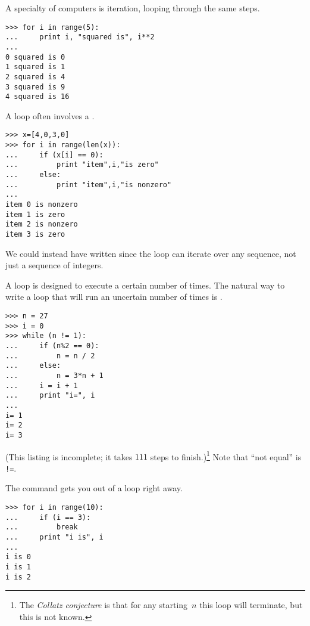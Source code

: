 A specialty of computers is iteration, looping through the same steps.
\begin{lstlisting}[style=python]
>>> for i in range(5):
...     print i, "squared is", i**2
... 
0 squared is 0
1 squared is 1
2 squared is 4
3 squared is 9
4 squared is 16
\end{lstlisting}
A  loop often involves a .
\begin{lstlisting}[style=python]
>>> x=[4,0,3,0]
>>> for i in range(len(x)):
...     if (x[i] == 0):
...         print "item",i,"is zero"
...     else:
...         print "item",i,"is nonzero"
... 
item 0 is nonzero
item 1 is zero
item 2 is nonzero
item 3 is zero  
\end{lstlisting}
We could instead have written  since
the  loop can iterate over any sequence, not just
a sequence of integers.

A  loop is designed to execute a certain
number of times.
The natural way to write a loop that will run an uncertain number of times
is .
\begin{lstlisting}[style=python]
>>> n = 27
>>> i = 0
>>> while (n != 1):
...     if (n%2 == 0):
...         n = n / 2
...     else:
...         n = 3*n + 1
...     i = i + 1
...     print "i=", i
... 
i= 1
i= 2
i= 3  
\end{lstlisting}
(This listing is incomplete; it takes $111$ steps to finish.)\footnote{The 
\protect\textit{Collatz conjecture} is 
that for any starting~$n$ this loop will 
terminate, but this is not known.}
Note that ``not equal'' is \lstinline[style=inline]@!=@. 

The  command gets you out of a loop right away.
\begin{lstlisting}
>>> for i in range(10):
...     if (i == 3):
...         break
...     print "i is", i
... 
i is 0
i is 1
i is 2  
\end{lstlisting}


